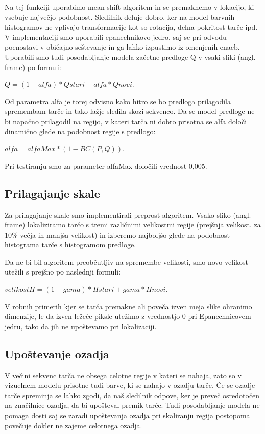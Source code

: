 \documentclass[a4paper]{article}
\begin{document}
Na tej funkciji uporabimo mean shift algoritem in se premaknemo v lokacijo, ki vsebuje največjo podobnost.
Sledilnik deluje dobro, ker na model barvnih histogramov ne vplivajo transformacije kot so rotacija, delna pokritost tarče ipd. 
V implementaciji smo uporabili epanechnikovo jedro, saj se pri odvodu poenostavi v običajno seštevanje in ga lahko izpustimo iz omenjenih enacb. Uporabili smo tudi posodabljanje modela začetne predloge Q v vsaki sliki (angl. frame) po formuli: 

$Q = (1-alfa)*Qstari + alfa*Qnovi$. 

Od parametra alfa je torej odvisno kako hitro se bo predloga prilagodila spremembam tarče in tako lažje sledila skozi sekvenco.
Da se model predloge ne bi napačno prilagodil na regijo, v kateri tarča ni dobro prisotna se alfa določi dinamično glede na podobnost regije s predlogo: 

$alfa = alfaMax *(1 - BC(P, Q))$. 

Pri testiranju smo za parameter alfaMax določili vrednost 0,005. 

\subsection{Prilagajanje skale}
Za prilagajanje skale smo implementirali preprost algoritem. Vsako sliko (angl. frame) lokaliziramo tarčo s tremi različnimi velikostmi regije (prejšnja velikost, za 10\% večja in manjša velikost) in izberemo najboljšo glede na podobnost histograma tarče s histogramom predloge.

Da ne bi bil algoritem preobčutljiv na spremembe velikosti, smo novo velikost utežili s prejšno po naslednji formuli: 

$velikostH = (1-gama)*Hstari + gama*Hnovi$. 

V robnih primerih kjer se tarča premakne ali poveča izven meja slike ohranimo dimenzije, le da izven ležeče piksle utežimo z vrednostjo 0 pri Epanechnicovem jedru, tako da jih ne upoštevamo pri lokalizaciji.
\subsection{Upoštevanje ozadja}
V večini sekvenc tarča ne obsega celotne regije v kateri se nahaja, zato so v vizuelnem modelu prisotne tudi barve, ki se nahajo v ozadju tarče. Če se ozadje tarče spreminja se lahko zgodi, da naš sledilnik odpove, ker je preveč osredotočen na značilnice ozadja, da bi upošteval premik tarče. Tudi posodabljanje modela ne pomaga dosti saj se zaradi upoštevanja ozadja pri skaliranju regija postopoma povečuje dokler ne zajeme celotnega ozadja. 
\end{document}
